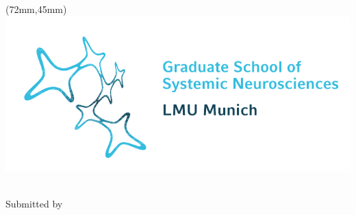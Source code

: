 \begin{titlepage}

\begin{addmargin}[-1cm]{-3.5cm}
\begin{center}

\mySubTitle

\begin{textblock*}{70mm}(72mm,45mm)
\centering
\vspace{10pt}
\includegraphics[width=\textwidth]{graphics/gsnlogo.pdf}
\end{textblock*}

\vspace{6.0cm}

\textbf{\LARGE \myTitle }\\
\vspace{2cm}
Submitted by\\
\vspace{0.5cm}
\textbf{\large \scshape \myName}\\
\vspace{0.2cm}
\textbf{\large \scshape \myTime}\\
\end{center}


\end{addmargin}
\end{titlepage}
